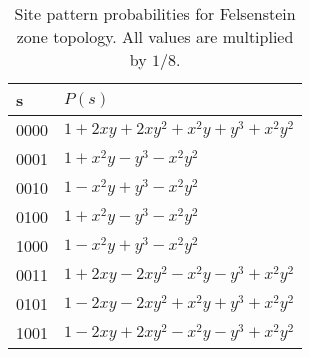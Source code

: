 \begin{table}
\centering
\begin{tabular}{|l|l|}
    \hline
s   &$P(s)$\\
    \hline
0000&$1+2xy+2xy^2+x^2y+y^3+x^2y^2$\\
0001&$1+x^2y-y^3-x^2y^2$\\
0010&$1-x^2y+y^3-x^2y^2$\\
0100&$1+x^2y-y^3-x^2y^2$\\
1000&$1-x^2y+y^3-x^2y^2$\\
0011&$1+2xy-2xy^2-x^2y-y^3+x^2y^2$\\
0101&$1-2xy-2xy^2+x^2y+y^3+x^2y^2$\\
1001&$1-2xy+2xy^2-x^2y-y^3+x^2y^2$\\
    \hline
\end{tabular}    
\caption{Site pattern probabilities for Felsenstein zone topology.
All values are multiplied by $1/8$.}
\label{tab:sitepatprob-fels}
\end{table}

